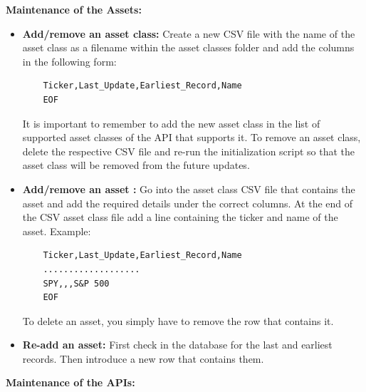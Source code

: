 \documentclass[main.tex]{subfiles}
\begin{document}
\textbf{Maintenance of the Assets:}
\begin{itemize}
    \item \textbf{Add/remove an asset class:} Create a new CSV file with the name of the asset class as a filename within the asset classes folder and add the columns in the following form:\newline
    \begin{lstlisting}
    Ticker,Last_Update,Earliest_Record,Name
    EOF
    \end{lstlisting}
    It is important to remember to add the new asset class in the list of supported asset classes of the API that supports it.\newline
    To remove an asset class, delete the respective CSV file and re-run the initialization script so that the asset class will be removed from the future updates. 
    \item \textbf{Add/remove an asset : } Go into the asset class CSV file that contains the asset and add the required details under the correct columns.
    At the end of the CSV asset class file add a line containing the ticker and name of the asset.\newline
    Example:
    \begin{lstlisting}
    Ticker,Last_Update,Earliest_Record,Name
    ...................
    SPY,,,S&P 500
    EOF    
    \end{lstlisting}
    To delete an asset, you simply have to remove the row that contains it.
    
    \item \textbf{Re-add an asset:} First check in the database for the last and earliest records. Then introduce a new row that contains them.
\end{itemize}

\textbf{Maintenance of the APIs:}
\end{document}
